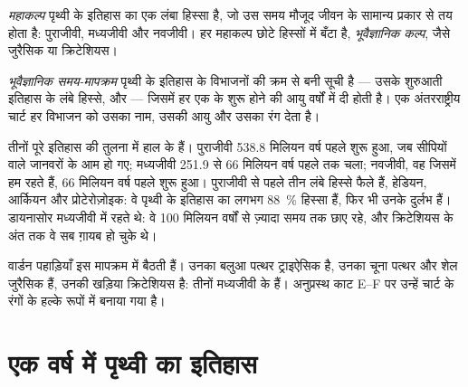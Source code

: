\begin{definition}[महाकल्प और भूवैज्ञानिक कल्प]\label{def:g7:geological-time:era-period}
\emph{महाकल्प} पृथ्वी के इतिहास का एक लंबा हिस्सा है, जो उस समय मौजूद
जीवन के सामान्य प्रकार से तय होता है: पुराजीवी, मध्यजीवी और नवजीवी। हर महाकल्प
छोटे हिस्सों में बँटा है, \emph{भूवैज्ञानिक कल्प}, जैसे
जुरैसिक या
क्रिटेशियस।
\end{definition}

\begin{definition}[भूवैज्ञानिक समय-मापक्रम]\label{def:g7:geological-time:time-scale}
\emph{भूवैज्ञानिक समय-मापक्रम} पृथ्वी के इतिहास के
विभाजनों की क्रम से बनी सूची है --- उसके शुरुआती इतिहास के लंबे हिस्से,  और
 --- जिसमें हर एक के शुरू होने की आयु वर्षों में दी होती है। एक
अंतरराष्ट्रीय चार्ट हर विभाजन को उसका नाम, उसकी आयु और उसका रंग
देता है।
\end{definition}


तीनों  पूरे इतिहास की तुलना में हाल के हैं। पुराजीवी \num{538.8} मिलियन वर्ष
पहले शुरू हुआ, जब सीपियों वाले जानवरों के  आम हो गए; मध्यजीवी \num{251.9}
से \num{66} मिलियन वर्ष पहले तक चला; नवजीवी, वह  जिसमें हम रहते हैं,
\num{66} मिलियन वर्ष पहले शुरू हुआ। पुराजीवी से पहले तीन लंबे हिस्से फैले हैं,
हेडियन, आर्कियन और प्रोटेरोज़ोइक: वे पृथ्वी के इतिहास का लगभग
88~\% हिस्सा हैं, फिर भी उनके  दुर्लभ हैं। डायनासोर मध्यजीवी में रहते थे: वे
\num{100} मिलियन वर्षों से ज़्यादा समय तक छाए रहे, और क्रिटेशियस के अंत तक वे सब
ग़ायब हो चुके थे।

वार्डन पहाड़ियाँ इस मापक्रम में बैठती हैं। उनका बलुआ पत्थर ट्राइऐसिक है, उनका चूना
पत्थर और शेल जुरैसिक हैं, उनकी खड़िया क्रिटेशियस है: तीनों मध्यजीवी के हैं।
अनुप्रस्थ काट E--F पर उन्हें चार्ट के रंगों के हल्के रूपों में बनाया
गया है।

\section{एक वर्ष में पृथ्वी का इतिहास}

